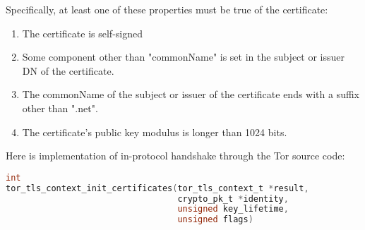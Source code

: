 Specifically, at least one of these properties must be true of the certificate:
\begin{enumerate}
	\item The certificate is self-signed
	\item Some component other than "commonName" is set in the subject or issuer DN of the certificate.
	\item The commonName of the subject or issuer of the certificate ends with a suffix other than ".net".
	\item The certificate's public key modulus is longer than 1024 bits.
\end{enumerate}
  
Here is implementation of in-protocol handshake through the Tor source code:

\begin{lstlisting}[language=c, caption={\href{https://gitweb.torproject.org/tor.git/tree/src/lib/tls/tortls.c}{in-protocol implementation} line number 287 }]
int
tor_tls_context_init_certificates(tor_tls_context_t *result,
                                  crypto_pk_t *identity,
                                  unsigned key_lifetime,
                                  unsigned flags)
\end{lstlisting}
  
  
  
  